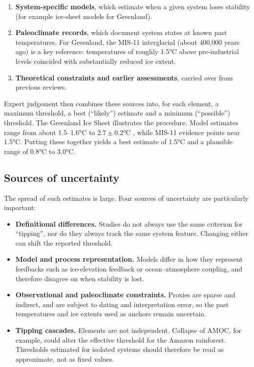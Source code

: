 \documentclass[
]{krantz}
\providecommand{\tightlist}{%
  \setlength{\itemsep}{0pt}\setlength{\parskip}{0pt}}
\begin{document}
\begin{enumerate}
\def\labelenumi{\arabic{enumi}.}
\tightlist
\item
  \textbf{System-specific models}, which estimate when a given system loses
  stability (for example ice-sheet models for Greenland).
\item
  \textbf{Paleoclimate records}, which document system states at known past
  temperatures. For Greenland, the MIS-11 interglacial (about 400,000
  years ago) is a key reference: temperatures of roughly 1.5°C above
  pre-industrial levels coincided with substantially reduced ice extent.
\item
  \textbf{Theoretical constraints and earlier assessments}, carried over from
  previous reviews.
\end{enumerate}

Expert judgement then combines these sources into, for each element, a
maximum threshold, a best (``likely'') estimate and a minimum (``possible'')
threshold. The Greenland Ice Sheet illustrates the procedure. Model
estimates range from about 1.5--1.6°C \citep{robinson2012} to
\(2.7\pm0.2\)°C \citep{noel2021}, while MIS-11 evidence points near 1.5°C.
Putting these together yields a best estimate of 1.5°C and a plausible
range of 0.8°C to 3.0°C.

\subsection{Sources of uncertainty}\label{sources-of-uncertainty}

The spread of such estimates is large. Four sources of uncertainty are
particularly important:

\begin{itemize}
\tightlist
\item
  \textbf{Definitional differences.} Studies do not always use the same
  criterion for ``tipping'', nor do they always track the same system
  feature. Changing either can shift the reported threshold.
\item
  \textbf{Model and process representation.} Models differ in how they
  represent feedbacks such as ice-elevation feedback or ocean--atmosphere
  coupling, and therefore disagree on when stability is lost.
\item
  \textbf{Observational and paleoclimate constraints.} Proxies are sparse and
  indirect, and are subject to dating and interpretation error, so the
  past temperatures and ice extents used as anchors remain uncertain.
\item
  \textbf{Tipping cascades.} Elements are not independent. Collapse of AMOC,
  for example, could alter the effective threshold for the Amazon
  rainforest. Thresholds estimated for isolated systems should therefore
  be read as approximate, not as fixed values.
\end{itemize}
\end{document}
